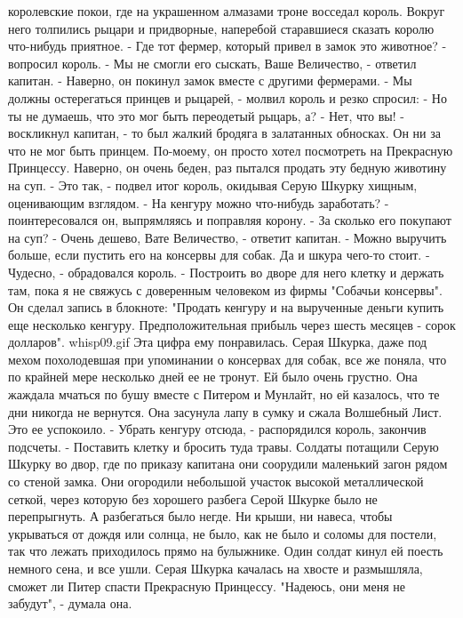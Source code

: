 королевские покои, где на украшенном алмазами троне восседал король. 
Вокруг него толпились рыцари и придворные, наперебой старавшиеся 
сказать королю что-нибудь приятное.
    - Где тот фермер, который привел в замок это животное? - вопросил 
король.
    - Мы не смогли его сыскать, Ваше Величество, - ответил капитан. - 
Наверно, он покинул замок вместе с другими фермерами.
    - Мы должны остерегаться принцев и рыцарей, - молвил король и 
резко спросил: - Но ты не думаешь, что это мог быть переодетый рыцарь, 
а?
    - Нет, что вы! - воскликнул капитан, - то был жалкий бродяга в 
залатанных обносках. Он ни за что не мог быть принцем. По-моему, он 
просто хотел посмотреть на Прекрасную Принцессу. Наверно, он очень 
беден, раз пытался продать эту бедную животину на суп.
    - Это так, - подвел итог король, окидывая Серую Шкурку хищным, 
оценивающим взглядом. - На кенгуру можно что-нибудь заработать? - 
поинтересовался он, выпрямляясь и поправляя корону. - За сколько его 
покупают на суп?
    - Очень дешево, Вате Величество, - ответит капитан. - Можно 
выручить больше, если пустить его на консервы для собак. Да и шкура 
чего-то стоит.
    - Чудесно, - обрадовался король. - Построить во дворе для него 
клетку и держать там, пока я не свяжусь с доверенным человеком из 
фирмы "Собачьи консервы".
    Он сделал запись в блокноте: "Продать кенгуру и на вырученные 
деньги купить еще несколько кенгуру. Предположительная прибыль через 
шесть месяцев - сорок долларов".
    {whisp09.gif}
    Эта цифра ему понравилась. Серая Шкурка, даже под мехом 
похолодевшая при упоминании о консервах для собак, все же поняла, что 
по крайней мере несколько дней ее не тронут.
    Ей было очень грустно. Она жаждала мчаться по бушу вместе с 
Питером и Мунлайт, но ей казалось, что те дни никогда не вернутся. Она 
засунула лапу в сумку и сжала Волшебный Лист. Это ее успокоило.
    - Убрать кенгуру отсюда, - распорядился король, закончив подсчеты. 
- Поставить клетку и бросить туда травы.
    Солдаты потащили Серую Шкурку во двор, где по приказу капитана они 
соорудили маленький загон рядом со стеной замка. Они огородили 
небольшой участок высокой металлической сеткой, через которую без 
хорошего разбега Серой Шкурке было не перепрыгнуть. А разбегаться было 
негде. Ни крыши, ни навеса, чтобы укрываться от дождя или солнца, не 
было, как не было и соломы для постели, так что лежать приходилось 
прямо на булыжнике.
    Один солдат кинул ей поесть немного сена, и все ушли.
    Серая Шкурка качалась на хвосте и размышляла, сможет ли Питер 
спасти Прекрасную Принцессу.
    "Надеюсь, они меня не забудут", - думала она.

